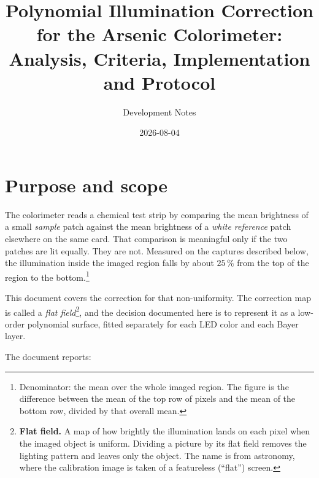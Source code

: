 \documentclass[11pt, a4paper]{article}
\title{%
  Polynomial Illumination Correction for the Arsenic Colorimeter:\\
  Analysis, Criteria, Implementation and Protocol}
\author{Development Notes}
\date{2026-08-04}
\newcommand{\pct}{\,\%}
\begin{document}
\maketitle
\tableofcontents
\newpage

\section{Purpose and scope}

The colorimeter reads a chemical test strip by comparing the mean
brightness of a small \emph{sample} patch
against the mean brightness of a \emph{white reference} patch
elsewhere on the same card.
That comparison is meaningful only if the two patches are lit equally.
They are not.
Measured on the captures described below,
the illumination inside the imaged region falls by about $25\pct$
from the top of the region to the bottom.\footnote{Denominator:
the mean over the whole imaged region.
The figure is the difference between the mean of the top row of pixels
and the mean of the bottom row, divided by that overall mean.}

This document covers the correction for that non-uniformity.
The correction map is called a \emph{flat
field}\footnote{\textbf{Flat field.}
A map of how brightly the illumination lands on each pixel
when the imaged object is uniform.
Dividing a picture by its flat field removes the lighting pattern
and leaves only the object.
The name is from astronomy,
where the calibration image is taken of a featureless (``flat'') screen.},
and the decision documented here is to represent it as a low-order
polynomial surface,
fitted separately for each LED color and each Bayer layer.

The document reports:
\end{document}
